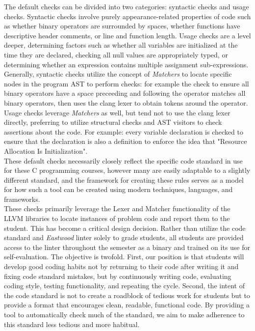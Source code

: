 \documentclass[sigconf]{acmart}
\begin{document}
The default checks can be divided into two categories: syntactic checks and usage
checks. Syntactic checks involve purely appearance-related properties of code such as
whether binary operators are surrounded by spaces, whether functions have descriptive
header comments, or line and function length. Usage checks are a level deeper,
determining factors such as whether all variables are initialized at the time they are
declared, checking all null values are appropriately typed, or determining whether an
expression contains multiple assignment sub-expressions. Generally, syntactic checks
utilize the concept of \textit{Matchers} to locate specific nodes in the program AST to
perform checks: for example the check to ensure all binary operators have a space
preceeding and following the operator matches all binary operators, then uses the clang
lexer to obtain tokens around the operator. Usage checks leverage \textit{Matchers} as
well, but tend not to use the clang lexer directly, preferring to utilize structural
checks and AST visitors to check assertions about the code. For example: every variable
declaration is checked to ensure that the declaration is also a definition to enforce
the idea that "Resource Allocation Is Initialization".
\\

These default checks necessarily closely reflect the specific code standard in use for
these C programming courses, however many are easily adaptable to a slightly different
standard, and the framework for creating these rules serves as a model for how such a
tool can be created using modern techniques, languages, and frameworks. \\

These checks primarily leverage the Lexer and Matcher functionality of the LLVM libraries
to locate instances of problem code and report them to the student. This has become a
critical design decision. Rather than utilize the code standard and \textit{Eastwood}
linter solely to grade students, all students are provided access to the linter 
throughout the semester as a binary and trained on its use for self-evaluation.
The objective is twofold. First, our position is that students will develop good coding
habits not by returning to their code after writing it and fixing code standard
mistakes, but by continuously writing code, evaluating coding style, testing
functionality, and repeating the cycle. Second, the intent of the code standard is not
to create a roadblock of tedious work for students but to provide a format that
encourages clean, readable, functional code. By providing a tool to automatically check
much of the standard, we aim to make adherence to this standard less tedious and more
habitual.
\\
\end{document}

